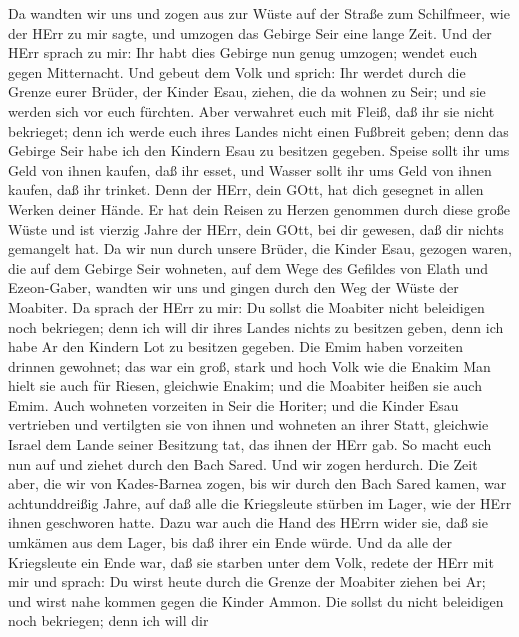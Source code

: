  Da wandten wir uns und zogen aus zur Wüste auf der Straße
zum Schilfmeer, wie der HErr zu mir sagte, und umzogen das Gebirge Seir
eine lange Zeit.  Und der HErr sprach zu mir: 
Ihr habt dies Gebirge nun genug umzogen; wendet euch gegen Mitternacht.
 Und gebeut dem Volk und sprich: Ihr werdet durch die Grenze
eurer Brüder, der Kinder Esau, ziehen, die da wohnen zu Seir; und sie
werden sich vor euch fürchten. Aber verwahret euch mit Fleiß,
 daß ihr sie nicht bekrieget; denn ich werde euch ihres
Landes nicht einen Fußbreit geben; denn das Gebirge Seir habe ich den
Kindern Esau zu besitzen gegeben.  Speise sollt ihr ums Geld
von ihnen kaufen, daß ihr esset, und Wasser sollt ihr ums Geld von ihnen
kaufen, daß ihr trinket.  Denn der HErr, dein GOtt, hat dich
gesegnet in allen Werken deiner Hände. Er hat dein Reisen zu Herzen
genommen durch diese große Wüste und ist vierzig Jahre der HErr, dein
GOtt, bei dir gewesen, daß dir nichts gemangelt hat.  Da wir
nun durch unsere Brüder, die Kinder Esau, gezogen waren, die auf dem
Gebirge Seir wohneten, auf dem Wege des Gefildes von Elath und
Ezeon-Gaber, wandten wir uns und gingen durch den Weg der Wüste der
Moabiter.  Da sprach der HErr zu mir: Du sollst die Moabiter
nicht beleidigen noch bekriegen; denn ich will dir ihres Landes nichts
zu besitzen geben, denn ich habe Ar den Kindern Lot zu besitzen gegeben.
 Die Emim haben vorzeiten drinnen gewohnet; das war ein
groß, stark und hoch Volk wie die Enakim  Man hielt sie
auch für Riesen, gleichwie Enakim; und die Moabiter heißen sie auch
Emim.  Auch wohneten vorzeiten in Seir die Horiter; und die
Kinder Esau vertrieben und vertilgten sie von ihnen und wohneten an
ihrer Statt, gleichwie Israel dem Lande seiner Besitzung tat, das ihnen
der HErr gab.  So macht euch nun auf und ziehet durch den
Bach Sared. Und wir zogen herdurch.  Die Zeit aber, die wir
von Kades-Barnea zogen, bis wir durch den Bach Sared kamen, war
achtunddreißig Jahre, auf daß alle die Kriegsleute stürben im Lager, wie
der HErr ihnen geschworen hatte.  Dazu war auch die Hand
des HErrn wider sie, daß sie umkämen aus dem Lager, bis daß ihrer ein
Ende würde.  Und da alle der Kriegsleute ein Ende war, daß
sie starben unter dem Volk,  redete der HErr mit mir und
sprach:  Du wirst heute durch die Grenze der Moabiter
ziehen bei Ar;  und wirst nahe kommen gegen die Kinder
Ammon. Die sollst du nicht beleidigen noch bekriegen; denn ich will dir
